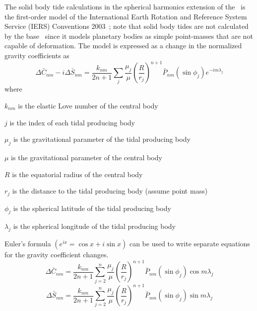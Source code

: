 The solid body tide calculations in the spherical harmonics extension of the
\ModelDesc\ is the first-order model of the International Earth Rotation and
Reference System Service (IERS) Conventions 2003~\cite{IERS2003}; note that
solid body tides are not calculated by the base \ModelDesc\, since it models
planetary bodies as simple point-masses that are not capable of deformation.
The model is expressed as a change in the normalized gravity coefficients as
\begin{equation}
\Delta\bar{C}_{nm}-i\Delta\bar{S}_{nm} = \frac{k_{nm}}{2n+1}\sum_{j}
\frac{\mu_j}{\mu}\left(\frac{R}{r_j}\right)^{n+1}\bar{P}_{nm}\left(\sin\phi_j\right)e^{-im\lambda_j}
\end{equation}
where 
\begin{description}
\item{$k_{nm}$ is the elastic Love number of the central body}
\item{$j$ is the index of each tidal producing body}
\item{$\mu_j$ is the gravitational parameter of the tidal producing body}
\item{$\mu$ is the gravitational parameter of the central body}
\item{$R$ is the equatorial radius of the central body}
\item{$r_j$ is the distance to the tidal producing body (assume point mass)}
\item{$\phi_j$ is the spherical latitude of the tidal producing body}
\item{$\lambda_j$ is the spherical longitude of the tidal producing body}
\end{description}

Euler's formula $(e^{ix}=\cos x +i\sin x)$ can be used to write separate
equations for the gravity coefficient changes.
\begin{equation}
\Delta\bar{C}_{nm}= \frac{k_{nm}}{2n+1}\sum_{j=2}^n
\frac{\mu_j}{\mu}\left(\frac{R}{r_j}\right)^{n+1}\bar{P}_{nm}\left(\sin\phi_j\right)\cos m\lambda_j
\end{equation}
\begin{equation}
\Delta\bar{S}_{nm}= \frac{k_{nm}}{2n+1}\sum_{j=2}^n
\frac{\mu_j}{\mu}\left(\frac{R}{r_j}\right)^{n+1}\bar{P}_{nm}\left(\sin\phi_j\right)\sin m\lambda_j
\end{equation}

